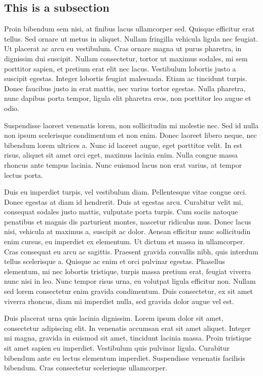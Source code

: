 \documentclass{icldt}
\begin{document}
\subsection{This is a subsection}

Proin bibendum sem nisi, at finibus lacus ullamcorper sed. Quisque efficitur erat tellus. Sed ornare ut metus in aliquet. Nullam fringilla vehicula ligula nec feugiat. Ut placerat ac arcu eu vestibulum. Cras ornare magna ut purus pharetra, in dignissim dui suscipit. Nullam consectetur, tortor ut maximus sodales, mi sem porttitor sapien, et pretium erat elit nec lacus. Vestibulum lobortis justo a suscipit egestas. Integer lobortis feugiat malesuada. Etiam ac tincidunt turpis. Donec faucibus justo in erat mattis, nec varius tortor egestas. Nulla pharetra, nunc dapibus porta tempor, ligula elit pharetra eros, non porttitor leo augue et odio.

Suspendisse laoreet venenatis lorem, non sollicitudin mi molestie nec. Sed id nulla non ipsum scelerisque condimentum et non enim. Donec laoreet libero neque, nec bibendum lorem ultrices a. Nunc id laoreet augue, eget porttitor velit. In est risus, aliquet sit amet orci eget, maximus lacinia enim. Nulla congue massa rhoncus ante tempus lacinia. Nunc euismod lacus non erat varius, at tempor lectus porta.

Duis eu imperdiet turpis, vel vestibulum diam. Pellentesque vitae congue orci. Donec egestas at diam id hendrerit. Duis at egestas arcu. Curabitur velit mi, consequat sodales justo mattis, vulputate porta turpis. Cum sociis natoque penatibus et magnis dis parturient montes, nascetur ridiculus mus. Donec lacus nisi, vehicula at maximus a, suscipit ac dolor. Aenean efficitur nunc sollicitudin enim cursus, eu imperdiet ex elementum. Ut dictum et massa in ullamcorper. Cras consequat eu arcu ac sagittis. Praesent gravida convallis nibh, quis interdum tellus scelerisque a. Quisque ac enim et orci pulvinar egestas. Phasellus elementum, mi nec lobortis tristique, turpis massa pretium erat, feugiat viverra nunc nisi in leo. Nunc tempor risus urna, eu volutpat ligula efficitur non. Nullam sed lorem consectetur enim gravida condimentum. Duis consectetur, ex sit amet viverra rhoncus, diam mi imperdiet nulla, sed gravida dolor augue vel est.

Duis placerat urna quis lacinia dignissim. Lorem ipsum dolor sit amet, consectetur adipiscing elit. In venenatis accumsan erat sit amet aliquet. Integer mi magna, gravida in euismod sit amet, tincidunt lacinia massa. Proin tristique sit amet sapien eu imperdiet. Vestibulum quis pulvinar ligula. Curabitur bibendum ante eu lectus elementum imperdiet. Suspendisse venenatis facilisis bibendum. Cras consectetur scelerisque ullamcorper.
\end{document}
